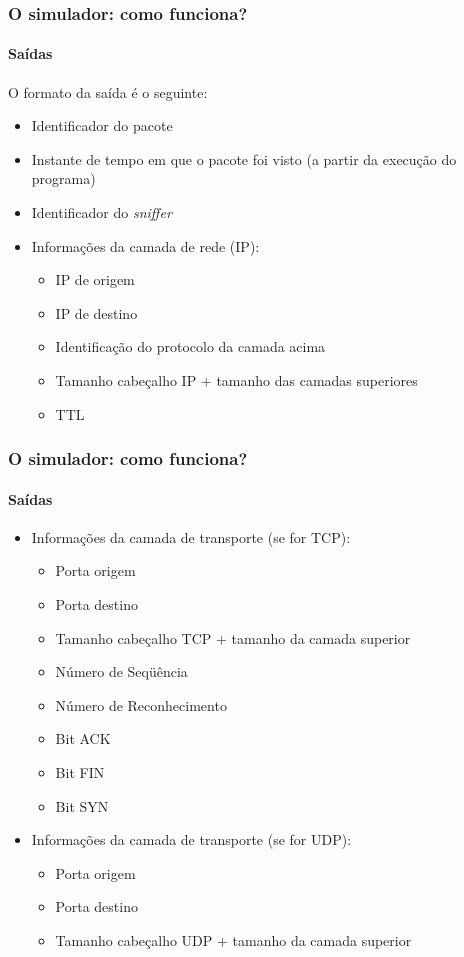 \documentclass{beamer}
\begin{document}
\begin{frame}
	\frametitle{O simulador: como funciona?}
	\framesubtitle{Saídas}
	O formato da saída é o seguinte:
	\begin{itemize}
		\item Identificador do pacote
		\item Instante de tempo em que o pacote foi visto (a partir da execução do programa)
		\item Identificador do \textit{sniffer}
		\item Informações da camada de rede (IP):
		\begin{itemize}
			\item IP de origem
			\item IP de destino
			\item Identificação do protocolo da camada acima
			\item Tamanho cabeçalho IP + tamanho das camadas superiores
			\item TTL
		\end{itemize}
	\end{itemize}
\end{frame}

\begin{frame}
	\frametitle{O simulador: como funciona?}
	\framesubtitle{Saídas}
	\begin{itemize}
		\item Informações da camada de transporte (se for TCP):
		\begin{itemize}
			\item Porta origem
			\item Porta destino
			\item Tamanho cabeçalho TCP + tamanho da camada superior
			\item Número de Seqüência
			\item Número de Reconhecimento
			\item Bit ACK
			\item Bit FIN
			\item Bit SYN
		\end{itemize}
		\item Informações da camada de transporte (se for UDP):
		\begin{itemize}
			\item Porta origem
			\item Porta destino
			\item Tamanho cabeçalho UDP + tamanho da camada superior
		\end{itemize}
	\end{itemize}
\end{frame}
\end{document}
